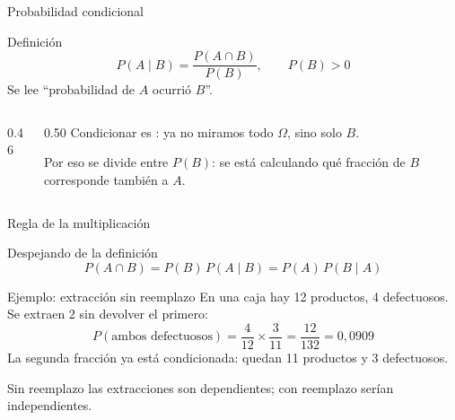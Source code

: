 \documentclass[aspectratio=169,10pt]{beamer}
\begin{document}
\begin{frame}{Probabilidad condicional}
  \begin{block}{Definición}
    \[ P(A\mid B)=\frac{P(A\cap B)}{P(B)}, \qquad P(B)>0 \]
    Se lee ``probabilidad de $A$  ocurrió $B$''.
  \end{block}

  \vspace{0.2cm}
  \begin{columns}[T,onlytextwidth]
    \begin{column}{0.46\textwidth}
      \centering
    \end{column}
    \begin{column}{0.50\textwidth}
      \footnotesize
      Condicionar es : ya no miramos todo
      $\Omega$, sino solo $B$.

      \vspace{0.25cm}
      Por eso se divide entre $P(B)$: se está calculando qué fracción de $B$
      corresponde también a $A$.
    \end{column}
  \end{columns}
\end{frame}

\begin{frame}{Regla de la multiplicación}
  \begin{block}{Despejando de la definición}
    \[ P(A\cap B)=P(B)\,P(A\mid B)=P(A)\,P(B\mid A) \]
  \end{block}

  \vspace{0.2cm}
  \begin{exampleblock}{Ejemplo: extracción sin reemplazo}
    \footnotesize
    En una caja hay 12 productos, 4 defectuosos. Se extraen 2 sin devolver el
    primero:
    \[ P(\text{ambos defectuosos})=\frac{4}{12}\times\frac{3}{11}
       =\frac{12}{132}=0{,}0909 \]
    La segunda fracción ya está condicionada: quedan 11 productos y 3
    defectuosos.
  \end{exampleblock}

  \vspace{0.15cm}
  {\footnotesize\color{uniGris} Sin reemplazo las extracciones son
  dependientes; con reemplazo serían independientes.}
\end{frame}
\end{document}
